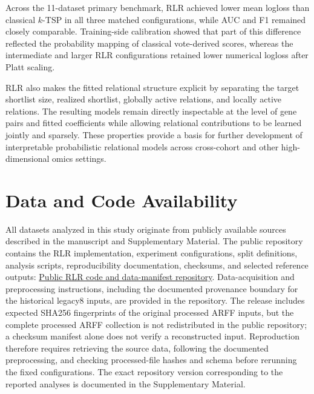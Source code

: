 \documentclass[preprint,12pt,a4paper]{elsarticle}
\begin{document}
Across the 11-dataset primary benchmark, RLR achieved lower mean logloss than classical $k$-TSP in all three matched configurations, while AUC and F1 remained closely comparable. Training-side calibration showed that part of this difference reflected the probability mapping of classical vote-derived scores, whereas the intermediate and larger RLR configurations retained lower numerical logloss after Platt scaling.

RLR also makes the fitted relational structure explicit by separating the target shortlist size, realized shortlist, globally active relations, and locally active relations. The resulting models remain directly inspectable at the level of gene pairs and fitted coefficients while allowing relational contributions to be learned jointly and sparsely. These properties provide a basis for further development of interpretable probabilistic relational models across cross-cohort and other high-dimensional omics settings.

\section*{Data and Code Availability}

All datasets analyzed in this study originate from publicly available sources described in the manuscript and Supplementary Material. The public repository contains the RLR implementation, experiment configurations, split definitions, analysis scripts, reproducibility documentation, checksums, and selected reference outputs:
\href{https://github.com/mczajkowskipb/relative-logistic-regression}{Public RLR code and data-manifest repository}.
Data-acquisition and preprocessing instructions, including the documented provenance boundary for the historical legacy8 inputs, are provided in the repository. The release includes expected SHA256 fingerprints of the original processed ARFF inputs, but the complete processed ARFF collection is not redistributed in the public repository; a checksum manifest alone does not verify a reconstructed input. Reproduction therefore requires retrieving the source data, following the documented preprocessing, and checking processed-file hashes and schema before rerunning the fixed configurations. The exact repository version corresponding to the reported analyses is documented in the Supplementary Material.
\end{document}
